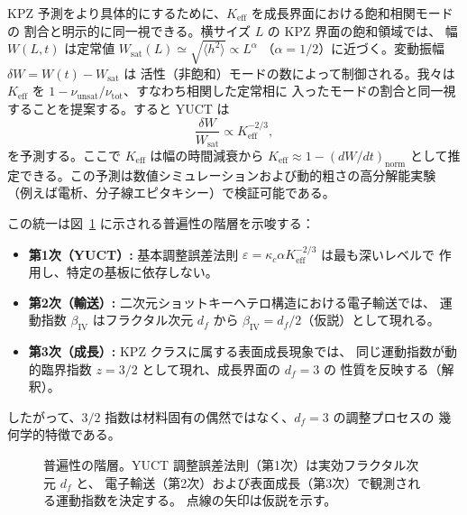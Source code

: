 \documentclass[12pt,a4paper]{article}
\newcommand{\Keff}{K_{\mathrm{eff}}}
\theoremstyle{remark}
\begin{document}
	KPZ 予測をより具体的にするために、$\Keff$ を成長界面における飽和相関モードの
	割合と明示的に同一視できる。横サイズ $L$ の KPZ 界面の飽和領域では、
	幅 $W(L,t)$ は定常値 $W_{\text{sat}}(L) \simeq \sqrt{\langle h^2 \rangle} \propto L^{\alpha}$
	（$\alpha = 1/2$）に近づく。変動振幅 $\delta W = W(t) - W_{\text{sat}}$ は
	活性（非飽和）モードの数によって制御される。我々は $\Keff$ を
	$1 - \nu_{\text{unsat}}/\nu_{\text{tot}}$、すなわち相関した定常相に
	入ったモードの割合と同一視することを提案する。すると YUCT は
	\begin{equation}
		\frac{\delta W}{W_{\text{sat}}} \propto \Keff^{-2/3},
		\label{eq:kpz-prediction}
	\end{equation}
	を予測する。ここで $\Keff$ は幅の時間減衰から $\Keff \approx 1 - (dW/dt)_{\text{norm}}$
	として推定できる。この予測は数値シミュレーションおよび動的粗さの高分解能実験
	（例えば電析、分子線エピタキシー）で検証可能である。
	
	この統一は図~\ref{fig:hierarchy} に示される普遍性の階層を示唆する：
	\begin{itemize}
		\item \textbf{第1次（YUCT）:} 基本調整誤差法則
		$\varepsilon = \kappa_c \alpha K_{\mathrm{eff}}^{-2/3}$ は最も深いレベルで
		作用し、特定の基板に依存しない。
		\item \textbf{第2次（輸送）:} 二次元ショットキーヘテロ構造における電子輸送では、
		運動指数 $\beta_{\mathrm{IV}}$ はフラクタル次元 $d_f$ から
		$\beta_{\mathrm{IV}} = d_f/2$（仮説）として現れる。
		\item \textbf{第3次（成長）:} KPZ クラスに属する表面成長現象では、
		同じ運動指数が動的臨界指数 $z = 3/2$ として現れ、成長界面の $d_f = 3$ の
		性質を反映する（解釈）。
	\end{itemize}
	したがって、$3/2$ 指数は材料固有の偶然ではなく、$d_f = 3$ の調整プロセスの
	幾何学的特徴である。
	
	\begin{figure}[htbp]
		\centering
		\caption{普遍性の階層。YUCT 調整誤差法則（第1次）は実効フラクタル次元 $d_f$ と、
			電子輸送（第2次）および表面成長（第3次）で観測される運動指数を決定する。
			点線の矢印は仮説を示す。}
		\label{fig:hierarchy}
	\end{figure}
	
\end{document}
